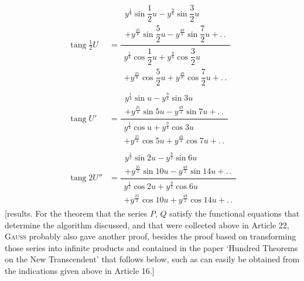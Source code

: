 \[
\begin{aligned}
\operatorname{tang}\tfrac12 U
 &=\dfrac{\begin{gathered}y^{\frac18}\sin\dfrac12u-y^{\frac98}\sin\dfrac32u\\[3pt]+y^{\frac{25}8}\sin\dfrac52u-y^{\frac{49}8}\sin\dfrac72u+\mathord{.}\,\mathord{.}\end{gathered}}{\begin{gathered}y^{\frac18}\cos\dfrac12u+y^{\frac98}\cos\dfrac32u\\[3pt]+y^{\frac{25}8}\cos\dfrac52u+y^{\frac{49}8}\cos\dfrac72u+\mathord{.}\,\mathord{.}\end{gathered}}\\[14pt]
\operatorname{tang} U'
 &=\dfrac{\begin{gathered}y^{\frac14}\sin u-y^{\frac94}\sin3u\\[3pt]+y^{\frac{25}4}\sin5u-y^{\frac{49}4}\sin7u+\mathord{.}\,\mathord{.}\end{gathered}}{\begin{gathered}y^{\frac14}\cos u+y^{\frac94}\cos3u\\[3pt]+y^{\frac{25}4}\cos5u+y^{\frac{49}4}\cos7u+\mathord{.}\,\mathord{.}\end{gathered}}\\[14pt]
\operatorname{tang}2U''
 &=\dfrac{\begin{gathered}y^{\frac12}\sin2u-y^{\frac92}\sin6u\\[3pt]+y^{\frac{25}2}\sin10u-y^{\frac{49}2}\sin14u+\mathord{.}\,\mathord{.}\end{gathered}}{\begin{gathered}y^{\frac12}\cos2u+y^{\frac92}\cos6u\\[3pt]+y^{\frac{25}2}\cos10u+y^{\frac{49}2}\cos14u+\mathord{.}\,\mathord{.}\end{gathered}}
\end{aligned}
\]
[results. For the theorem that the series $P$, $Q$ satisfy the functional equations that determine the algorithm discussed, and that were collected above in Article 22, \textsc{Gauss} probably also gave another proof, besides the proof based on transforming those series into infinite products and contained in the paper ‘Hundred Theorems on the New Transcendent’ that follows below, such as can easily be obtained from the indications given above in Article 16.]

